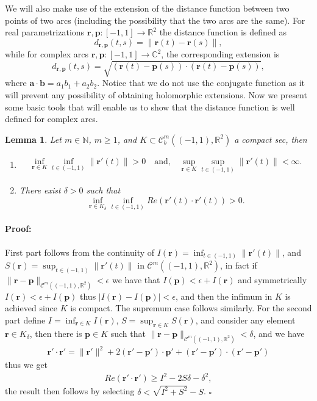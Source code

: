 \documentclass{article}
\newtheorem{lemma}[theorem]{Lemma}
\newenvironment{proof}{\paragraph{Proof:}}{\hfill$\square$}
\newcommand{\ba} {\bm a}
\newcommand{\IC}{{\mathbb C}}
\newcommand{\IN}{{\mathbb N}}
\newcommand{\IR}{{\mathbb R}}
\newcommand{\bp}{{\bm p}}
\newcommand{\cmspace}[3]{\mathcal{C}^{#1} \left( #2, #3 \right)}
\newcommand{\rgeo}[1]{\mathcal{C}_b^{#1}\left( (-1,1), \IR^2 \right)}
\newcommand{\br}{\bm{r}}
\newcommand{\bb}{\bm{b}}
\begin{document}
We will also make use of the extension of the distance function between two points of two arcs (including the possibility that the two arcs are the same).  For real parametrizations $\br, \bp :[-1,1] \rightarrow \IR^2$ the distance function is defined as 
$$d_{\br,\bp}(t,s) = \| \br(t) - \br(s)\|,$$
while for complex arcs $\br, \bp :[-1,1] \rightarrow \IC^2$, the corresponding extension is 
$$d_{\br,\bp}(t,s) =  \sqrt{(\br(t)-\bp(s))\cdot (\br(t)-\bp(s))},$$
where $\ba \cdot \bb  = a_1 b_1 + a_2 b_2$. Notice that we do not use the conjugate function as it will prevent any possibility of obtaining holomorphic extensions.  Now we present some basic tools that will enable us to show that the distance function is well defined for complex arcs. 
\begin{lemma}
\label{lemma:dwelldef}
Let $m \in \IN$, $m\geq1$, and $K \subset \rgeo{m}$ a compact sec, then 
\begin{enumerate}
\item 
\begin{align*}
\inf_{\br \in K } \inf_{t \in (-1,1)} \| \br'(t) \|>0  \quad \text{and,} \quad  \sup_{\br \in K} \sup_{t \in (-1,1)} \| \br'(t)\| < \infty.
\end{align*}
\item 
There exist $\delta >0 $ such that  
$$ 
\inf_{\br \in K_\delta} \inf_{t \in (-1,1)}Re (\br'(t) \cdot \br'(t)) > 0 .$$
\end{enumerate}
\end{lemma}
\begin{proof}
First part follows from the continuity of $I(\br) = \inf_{t \in (-1,1)} \| \br'(t)\|$, and $S(\br) = \sup_{t \in (-1,1)} \| \br'(t)\|$ in $\cmspace{m}{(-1,1)}{\IR^2}$, in fact if $\| \br -\bp \|_{\cmspace{m}{(-1,1)}{\IR^2}}< \epsilon$ we have that 
$I(\bp)  < \epsilon + I(\br)$
and symmetrically 
$
I(\br)  < \epsilon + I(\bp)
$
thus $|I(\br) - I(\bp)| < \epsilon$, and then the infimum in $K$ is achieved since $K$ is compact. The supremum case follows similarly. For the second part define $I = \inf_{\br \in K } I(\br)$, $S =\sup_{\br \in K } S(\br)$, and consider any element $\br \in K_\delta$, then there is $\bp \in K$ such that $\| \br -\bp \|_{\cmspace{m}{(-1,1)}{\IR^2}} < \delta$, and we have 
\begin{align*}
\br' \cdot \br' = \|\br'\|^2+ 2(\br' -\bp')\cdot \bp' +(\br'-\bp')\cdot(\br'-\bp') 
\end{align*}
thus we get
\begin{align*}
Re(\br' \cdot \br') \geq I^2 - 2S\delta -\delta^2, \end{align*}
the result then follows by selecting $\delta < \sqrt{I^2+S^2}-S$.
\end{proof} 
\end{document}
